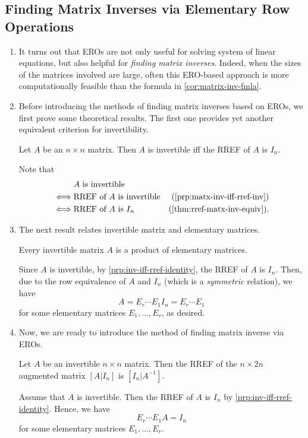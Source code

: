 \subsection{Finding Matrix Inverses via Elementary Row Operations}
\begin{enumerate}
\item It turns out that EROs are not only useful for solving system of linear
equations, but also helpful for \emph{finding matrix inverses}. Indeed, when
the sizes of the matrices involved are large, often this ERO-based approach is
more computationally feasible than the formula in \cref{cor:matrix-inv-fmla}.

\item Before introducing the methods of finding matrix inverses based on EROs,
we first prove some theoretical results. The first one provides yet another
equivalent criterion for invertibility.

\begin{proposition}
\label{prp:inv-iff-rref-identity}
Let \(A\) be an \(n\times n\) matrix. Then \(A\) is invertible iff the RREF of
\(A\) is \(I_n\).
\end{proposition}
\begin{pf}
Note that
\begin{align*}
&\text{\(A\) is invertible}\\
\iff&\text{RREF of \(A\) is invertible}&\text{(\cref{prp:matx-inv-iff-rref-inv})}\\
\iff&\text{RREF of \(A\) is \(I_n\)}&\text{(\cref{thm:rref-matx-inv-equiv})}.
\end{align*}
\end{pf}
\item The next result relates invertible matrix and elementary matrices.
\begin{corollary}
\label{cor:inv-matx-prod-elementary}
Every invertible matrix \(A\) is a product of elementary matrices.
\end{corollary}
\begin{pf}
Since \(A\) is invertible, by \cref{prp:inv-iff-rref-identity}, the RREF of
\(A\) is \(I_n\). Then, due to the row equivalence of \(A\) and \(I_n\) (which
is a \emph{symmetric} relation), we have
\[
A=E_r\dotsb E_1I_n=E_r\dotsb E_1
\]
for some elementary matrices \(E_1,\dotsc,E_r\), as desired.
\end{pf}
\item Now, we are ready to introduce the method of finding matrix inverse via
EROs.

\begin{theorem}
\label{thm:find-inv-ero}
Let \(A\) be an invertible \(n\times n\) matrix. Then the RREF of the \(n\times
2n\) augmented matrix \([A|I_n]\) is \([I_n|A^{-1}]\).
\end{theorem}
\begin{pf}
Assume that \(A\) is invertible. Then the RREF of \(A\) is \(I_n\) by
\cref{prp:inv-iff-rref-identity}. Hence, we have
\begin{equation}
\label{eq:inv-rref-identity}
E_r\dotsb E_1A=I_n
\end{equation}
for some elementary matrices \(E_1,\dotsc,E_r\).


\end{pf}
\end{enumerate}
